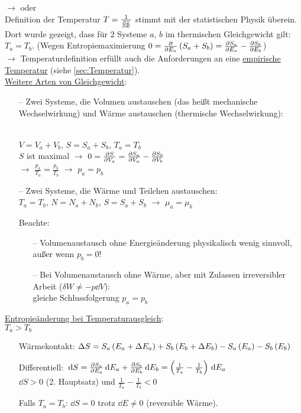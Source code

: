 $\rightarrow$  oder \\
Definition der Temperatur $T = \frac{1}{\frac{\partial S}{\partial E}}$ stimmt mit der statistischen Physik überein.\\
Dort wurde gezeigt, dass für $2$ Systeme $a$, $b$ im thermischen Gleichgewicht gilt: $T_a= T_b$. (Wegen Entropiemaximierung $0=\frac{\partial }{\partial E_a}\left( S_a+S_b \right) = \frac{\partial S_a}{\partial E_a} - \frac{\partial S_b}{\partial E_b}$)\\
$\rightarrow$ Temperaturdefinition erfüllt auch die Anforderungen an eine \uline{empirische Temperatur} (siehe \ref{sec:Temperatur}).\\
\uline{Weitere Arten von Gleichgewicht}:

\begin{itemize}[align=left]
  \item[--] Zwei Systeme, die Volumen austauschen (das heißt mechanische Wechselwirkung) und Wärme austauschen (thermische Wechselwirkung):\\
  {\centering
  
  }\\
  $V = V_a + V_b$, $S = S_a + S_b$, $T_a = T_b$\\
  $S$ ist maximal $\rightarrow$ $0 = \frac{\partial S}{\partial V_a} = \frac{\partial S_a}{\partial V_a} - \frac{\partial S_b}{\partial V_b}$\\
  $\rightarrow$ $\frac{p_a}{T_a} = \frac{p_b}{T_b}$ $\rightarrow$ $p_a = p_b$
  \item[--] Zwei Systeme, die Wärme und Teilchen austauschen:\\
  $T_a = T_b$, $N = N_a + N_b$, $S = S_a + S_b$ $\rightarrow$ $\mu_a = \mu_b$
  \item[Beachte:]
  \begin{itemize}
      \item[--] Volumenaustausch ohne Energieänderung physikalisch wenig sinnvoll, außer wenn $p_b = 0$!
      \item[--] Bei Volumenaustausch ohne Wärme, aber mit Zulassen irreversibler Arbeit ($\delta W \neq - p \dd{V}$):\\
      gleiche Schlussfolgerung $p_a = p_b$
  \end{itemize}
\end{itemize}

\uline{Entropieänderung bei Temperaturausgleich}:\\
 $T_a > T_b$

\begin{itemize}[align=left]
  \item[Wärmekontakt:] $\Delta S = S_a\left( E_a + \Delta E_a \right) + S_b\left( E_b + \Delta E_b \right) - S_a\left( E_a \right) - S_b\left( E_b \right)$
  \item[Differentiell:] $\,\text d{S} = \frac{\partial S_a}{\partial E_a}\,\text d{E_a} + \frac{\partial S_b}{\partial E_b}\,\text d{E_b} = \left( \frac{1}{T_a} - \frac{1}{T_b} \right)\,\text d{E_a}$\\
  $\dd{S} > 0$ (2. Hauptsatz) und $\frac{1}{T_a} - \frac{1}{T_b} < 0$
  \item[Falls $T_a = T_b$:] $\dd{S} = 0$ trotz $\dd{E} \neq 0$ (reversible Wärme).
\end{itemize}

